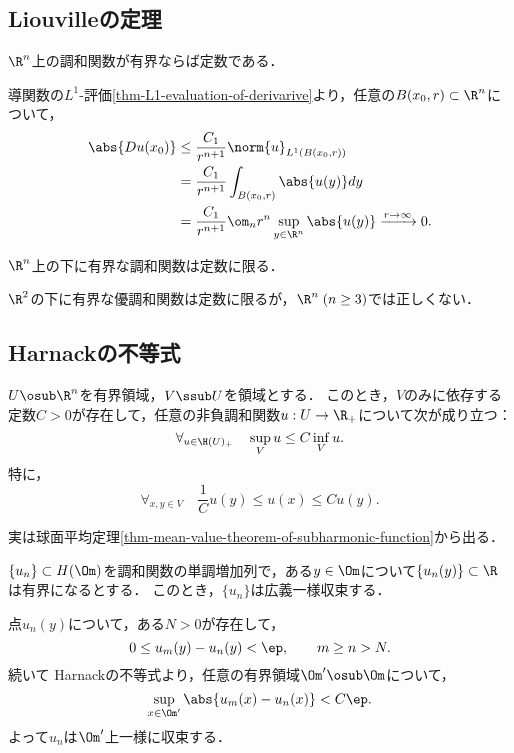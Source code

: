\documentclass[uplatex,dvipdfmx]{jsreport}
\begin{document}
\subsection{Liouvilleの定理}

\begin{corollary}\label{cor-Liouville}
    $\R^n$上の調和関数が有界ならば定数である．
\end{corollary}
\begin{Proof}
    導関数の$L^1$-評価\ref{thm-L1-evaluation-of-derivarive}より，任意の$B(x_0,r)\subset\R^n$について，
    \begin{align*}
        \abs{Du(x_0)}&\le\frac{C_1}{r^{n+1}}\norm{u}_{L^1(B(x_0,r))}\\
        &=\frac{C_1}{r^{n+1}}\int_{B(x_0,r)}\abs{u(y)}dy\\
        &=\frac{C_1}{r^{n+1}}\om_nr^n\sup_{y\in\R^n}\abs{u(y)}\xrightarrow{r\to\infty}0.
    \end{align*}
\end{Proof}

\begin{proposition}
    $\R^n$上の下に有界な調和関数は定数に限る．
\end{proposition}
\begin{remark}
    $\R^2$の下に有界な優調和関数は定数に限るが，$\R^n\;(n\ge3)$では正しくない．
\end{remark}

\subsection{Harnackの不等式}

\begin{theorem}[Harnackの不等式]
    $U\osub\R^n$を有界領域，$V\ssub U$を領域とする．
    このとき，$V$のみに依存する定数$C>0$が存在して，任意の非負調和関数$u:U\to\R_+$について次が成り立つ：
    \[\forall_{u\in\H(U)_+}\quad\sup_{V}u\le C\inf_Vu.\]
    特に，
    \[\forall_{x,y\in V}\quad\frac{1}{C}u(y)\le u(x)\le Cu(y).\]
\end{theorem}
\begin{Proof}
    実は球面平均定理\ref{thm-mean-value-theorem-of-subharmonic-function}から出る．

\end{Proof}

\begin{corollary}[Harnackの収束定理]
    $\{u_n\}\subset H(\Om)$を調和関数の単調増加列で，ある$y\in\Om$について$\{u_n(y)\}\subset\R$は有界になるとする．
    このとき，$\{u_n\}$は広義一様収束する．
\end{corollary}
\begin{Proof}
    点$u_n(y)$について，ある$N>0$が存在して，
    \[0\le u_m(y)-u_n(y)<\ep,\qquad m\ge n>N.\]
    続いて
    Harnackの不等式より，任意の有界領域$\Om'\osub\Om$について，
    \[\sup_{x\in\Om'}\abs{u_m(x)-u_n(x)}<C\ep.\]
    よって$u_n$は$\Om'$上一様に収束する．
\end{Proof}
\end{document}
